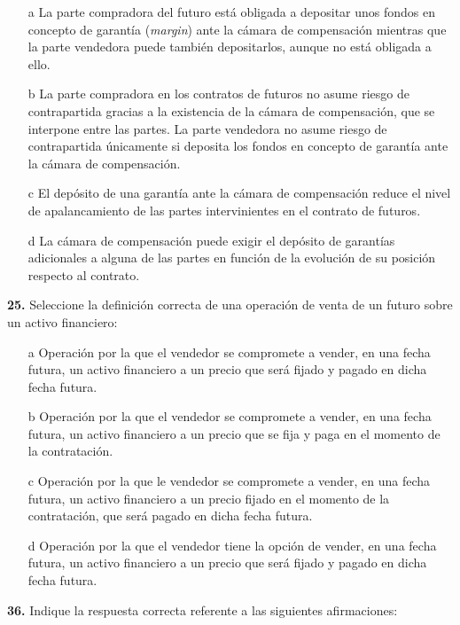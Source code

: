 \documentclass{nuevotema}
\begin{document}
\begin{enumerate}
    \item[a] La parte compradora del futuro está obligada a depositar unos fondos en concepto de garantía (\textit{margin}) ante la cámara de compensación mientras que la parte vendedora puede también depositarlos, aunque no está obligada a ello.
    \item[b] La parte compradora en los contratos de futuros no asume riesgo de contrapartida gracias a la existencia de la cámara de compensación, que se interpone entre las partes. La parte vendedora no asume riesgo de contrapartida únicamente si deposita los fondos en concepto de garantía ante la cámara de compensación.
    \item[c] El depósito de una garantía ante la cámara de compensación reduce el nivel de apalancamiento de las partes intervinientes en el contrato de futuros.
    \item[d] La cámara de compensación puede exigir el depósito de garantías adicionales a alguna de las partes en función de la evolución de su posición respecto al contrato.
\end{enumerate}


\textbf{25.} Seleccione la definición correcta de una operación de venta de un futuro sobre un activo financiero:

\begin{itemize}
	\item[a] Operación por la que el vendedor se compromete a vender, en una fecha futura, un activo financiero a un precio que será fijado y pagado en dicha fecha futura.
	\item[b] Operación por la que el vendedor se compromete a vender, en una fecha futura, un activo financiero a un precio que se fija y paga en el momento de la contratación.
	\item[c] Operación por la que le vendedor se compromete a vender, en una fecha futura, un activo financiero a un precio fijado en el momento de la contratación, que será pagado en dicha fecha futura.
	\item[d] Operación por la que el vendedor tiene la opción de vender, en una fecha futura, un activo financiero a un precio que será fijado y pagado en dicha fecha futura.
\end{itemize}


\textbf{36.} Indique la respuesta correcta referente a las siguientes afirmaciones:
\end{document}
